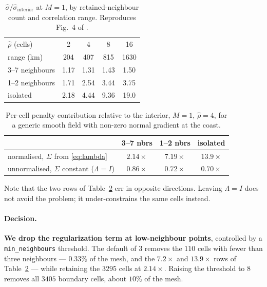 \documentclass[11pt]{article}
\newcommand{\rhohat}{\hat{\rho}}
\newcommand{\shat}{\hat{\sigma}}
\begin{document}
\begin{table}[htbp]
\centering
\caption{$\shat/\shat_{\text{interior}}$ at $M=1$, by retained-neighbour count and
correlation range. Reproduces Fig.~4 of \citet{smith2022}.}
\label{tab:sigma}
\begin{tabular}{lcccc}
\toprule
$\rhohat$ (cells) & 2 & 4 & 8 & 16 \\
range (\si{\kilo\metre}) & 204 & 407 & 815 & 1630 \\
\midrule
3--7 neighbours & 1.17 & 1.31 & 1.43 & 1.50 \\
1--2 neighbours & 1.71 & 2.54 & 3.44 & 3.75 \\
isolated        & 2.18 & 4.44 & 9.36 & 19.0 \\
\bottomrule
\end{tabular}
\end{table}

\begin{table}[htbp]
\centering
\caption{Per-cell penalty contribution relative to the interior, $M=1$, $\rhohat=4$, for a
generic smooth field with non-zero normal gradient at the coast.}
\label{tab:coast}
\begin{tabular}{lccc}
\toprule
 & 3--7 nbrs & 1--2 nbrs & isolated \\
\midrule
normalised, $\Sigma$ from \eqref{eq:lambda} & $2.14\times$ & $7.19\times$ & $13.9\times$ \\
unnormalised, $\Sigma$ constant ($\Lambda = I$) & $0.86\times$ & $0.72\times$ & $0.70\times$ \\
\bottomrule
\end{tabular}
\end{table}

Note that the two rows of Table~\ref{tab:coast} err in opposite directions. Leaving
$\Lambda = I$ does not avoid the problem; it under-constrains the same cells instead.

\paragraph{Decision.} \textbf{We drop the regularization term at low-neighbour points},
controlled by a \texttt{min\_neighbours} threshold. The default of $3$ removes the $110$
cells with fewer than three neighbours --- $0.33\%$ of the mesh, and the $7.2\times$ and
$13.9\times$ rows of Table~\ref{tab:coast} --- while retaining the $3295$ cells at
$2.14\times$. Raising the threshold to $8$ removes all $3405$ boundary cells, about
$10\%$ of the mesh.
\end{document}
